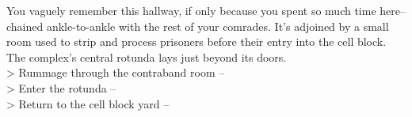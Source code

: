 You vaguely remember this hallway, if only because you spent so much time here--chained ankle-to-ankle with the rest of your comrades. It’s adjoined by a small room used to strip and process prisoners before their entry into the cell block. The complex’s central rotunda lays just beyond its doors.\\

> Rummage through the contraband room -- \\
> Enter the rotunda -- \\
> Return to the cell block yard -- 